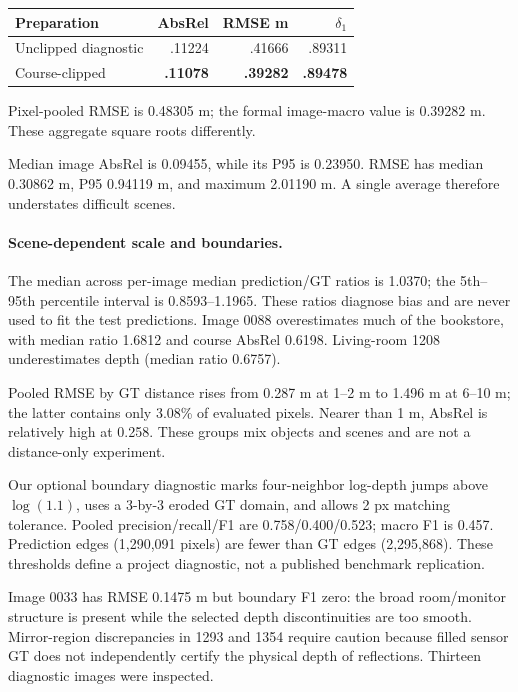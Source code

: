 \documentclass[10pt,twocolumn,letterpaper]{article}
\begin{document}
\begin{center}\begin{minipage}{\linewidth}\centering
{}
\label{tab:nyu}
\begin{tabular}{lrrr}
\toprule
Preparation & AbsRel & RMSE m & $\delta_1$\\
\midrule
Unclipped diagnostic &.11224&.41666&.89311\\
Course-clipped &\textbf{.11078}&\textbf{.39282}&\textbf{.89478}\\
\bottomrule
\end{tabular}
\end{minipage}\end{center}

Pixel-pooled RMSE is 0.48305 m; the formal image-macro value is 0.39282 m. These aggregate square roots differently.

Median image AbsRel is 0.09455, while its P95 is 0.23950. RMSE has median 0.30862 m, P95 0.94119 m, and maximum 2.01190 m. A single average therefore understates difficult scenes.

\paragraph{Scene-dependent scale and boundaries.}
The median across per-image median prediction/GT ratios is 1.0370; the 5th--95th percentile interval is 0.8593--1.1965. These ratios diagnose bias and are never used to fit the test predictions. Image 0088 overestimates much of the bookstore, with median ratio 1.6812 and course AbsRel 0.6198. Living-room 1208 underestimates depth (median ratio 0.6757).

Pooled RMSE by GT distance rises from 0.287 m at 1--2 m to 1.496 m at 6--10 m; the latter contains only 3.08\% of evaluated pixels. Nearer than 1 m, AbsRel is relatively high at 0.258. These groups mix objects and scenes and are not a distance-only experiment.

Our optional boundary diagnostic marks four-neighbor log-depth jumps above $\log(1.1)$, uses a 3-by-3 eroded GT domain, and allows 2 px matching tolerance. Pooled precision/recall/F1 are 0.758/0.400/0.523; macro F1 is 0.457. Prediction edges (1,290,091 pixels) are fewer than GT edges (2,295,868). These thresholds define a project diagnostic, not a published benchmark replication.

Image 0033 has RMSE 0.1475 m but boundary F1 zero: the broad room/monitor structure is present while the selected depth discontinuities are too smooth. Mirror-region discrepancies in 1293 and 1354 require caution because filled sensor GT does not independently certify the physical depth of reflections. Thirteen diagnostic images were inspected.
\end{document}
